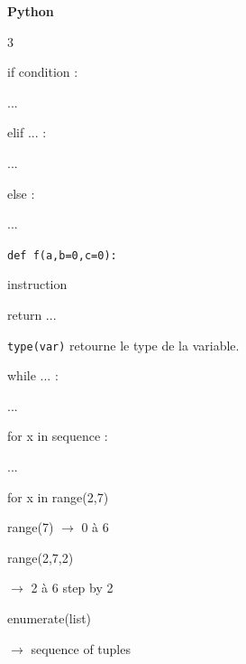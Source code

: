 \documentclass[a4paper,10pt]{article}
\begin{document}

\begin{center}
    {\LARGE \textbf{Python}}
\end{center}

\begin{multicols}{3}

\begin{tcolorbox}[title=Conditions]
if condition :

\hspace*{5mm}...

elif ... :

\hspace*{5mm}...

else :

\hspace*{5mm}...
\end{tcolorbox}

\begin{tcolorbox}[title=Fonctions]
\texttt{def f(a,b=0,c=0):}

\hspace*{5mm}instruction

\hspace*{5mm}return ...

\vspace{2mm}

\texttt{type(var)} retourne le type de la variable.
\end{tcolorbox}

\begin{tcolorbox}[title=Boucles]
while ... :

\hspace*{5mm}...

\vspace{2mm}

for x in sequence :

\hspace*{5mm}...

\vspace{2mm}

for x in range(2,7)

range(7) $\rightarrow$ 0 à 6

range(2,7,2)

$\rightarrow$ 2 à 6 step by 2

\vspace{2mm}

enumerate(list)

$\rightarrow$ sequence of tuples


\end{tcolorbox}
\end{multicols}
\end{document}
